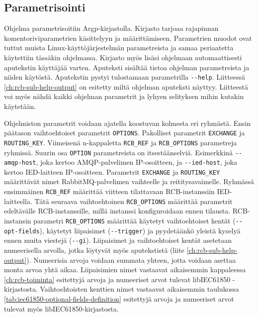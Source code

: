 \subsection{Parametrisointi}
Ohjelma parametrisoitiin Argp-kirjastolla. Kirjasto tarjoaa rajapinnan komentoriviparametrien käsittelyyn ja määrittämiseen. Parametrien muodot ovat tuttut muista Linux-käyt\-tö\-jär\-jes\-tel\-män parametreista ja samaa periaatetta käytettiin tässäkin ohjelmassa. Kirjasto myös lisäsi ohjelmaan automaattisesti aputekstin käyttäjää varten. Aputeksti sisältää tietoa ohjelman parametreista ja niiden käytöstä. Aputekstin pystyi tulostamaan parametrilla \texttt{-{}-help}. Liitteessä \ref{ch:rcb-sub-help-output} on esitetty miltä ohjelman aputeksti näyttyy. Liitteestä voi myös nähdä kaikki ohjelman parametrit ja lyhyen selityksen mihin kutakin käytetään.

Ohjelmiston parametrit voidaan ajatella koostuvan kolmesta eri ryhmästä. Ensin päätason vaihtoehtoiset parametrit \texttt{OPTIONS}. Pakolliset parametrit \texttt{EXCHANGE} ja \texttt{ROUTING\_KEY}. Viimeisenä n-kappaletta \texttt{RCB\_REF} ja \texttt{RCB\_OPTIONS} parametreja ryhmissä. Suurin osa \texttt{OPTION} parametreista on itsestäänselviä. Esimerkkinä \texttt{-{}-amqp-host}, joka kertoo A\-M\-Q\-P-pal\-ve\-li\-men IP-osoitteen, ja \texttt{-{}-ied-host}, joka kertoo IED-laitteen IP-osoitteen. Parametrit \texttt{EXCHANGE} ja \texttt{ROUTING\_KEY} määrittävät nimet RabbitMQ-palvelimen vaihteelle ja reititysavaimelle. Ryhmässä ensimmäinen \texttt{RCB\_REF} määrittää viitteen tilattavaan RCB-instanssiin IED-laitteella. Tätä seuraava vaihtoehtoinen \texttt{RCB\_OPTIONS} määrittää parametrit edeltävälle RCB-instanssille, millä instanssi konfiguroidaan ennen tilausta. RCB-instansin parametri \texttt{RCB\_OPTIONS} määrittää käytetyt vaihtoehtoiset kentät (\texttt{-{}-opt-fields}), käytetyt liipaisimet (\texttt{-{}-trigger}) ja pyydetäänkö yleistä kyselyä ennen muita viestejä (\texttt{-{}-gi}). Liipaisimet ja vaihtoehtoiset kentät asetetaan numeerisella arvolla, jotka löytyvät myös aputekstistä (liite \ref{ch:rcb-sub-help-output}). Numeerisia arvoja voidaan summata yhteen, jotta voidaan asettaa monta arvoa yhtä aikaa. Liipaisimien nimet vastaavat aikaisemmin kappaleessa \ref{ch:rcb-toiminta} esitettyjä arvoja ja numeeriset arvot tulevat libIEC61850 -kirjastosta. Vaihtoehtoisten kenttien nimet vastaavat aikaisemmin taulukossa \ref{tab:iec61850-optional-fields-definition} esitettyjä arvoja ja numeeriset arvot tulevat myös libIEC61850-kirjastosta.

